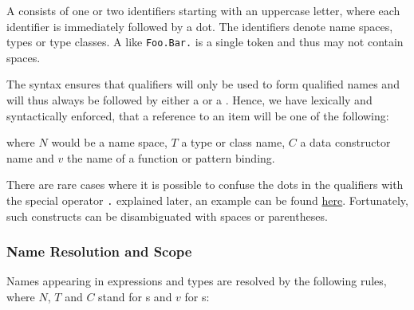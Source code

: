 A  consists of one or two identifiers starting
with an uppercase letter, where each identifier is immediately
followed by a dot. The identifiers denote name spaces, types or type
classes. A  like \texttt{Foo.Bar.} is a single
token and thus may not contain spaces.

The syntax ensures that qualifiers will
only be used to form qualified names and will
thus always be followed by either a
 or a . Hence, we have lexically and syntactically
enforced, that a reference to an item will be one of
the following:


where $N$ would be a name space, $T$ a type or class name, $C$ a
data constructor name and $v$ the name of a function or pattern binding.

There are rare cases where it is possible to confuse the dots in the qualifiers with
the special operator \texttt{.} explained later, an example can be found  \hyperref[confusedots]{here}. 
Fortunately, such constructs can be disambiguated with spaces or parentheses.


\subsubsection{Name Resolution and Scope}

Names appearing in expressions and types are resolved by the following rules, where $N$, $T$ and $C$ stand for s and $v$ for s:

